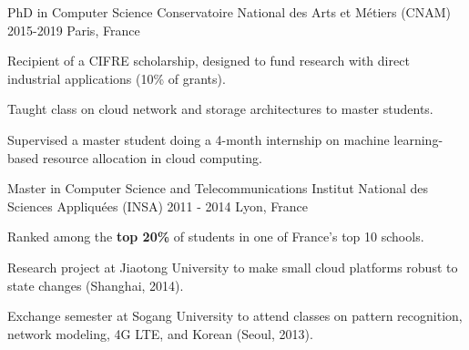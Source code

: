 
\begin{cventries}

  \cventry
  {PhD in Computer Science}
  {Conservatoire National des Arts et Métiers (CNAM)} %
  {2015-2019} %
  {Paris, France} %
    {
      \begin{cvitems} %
      \item{Recipient of a CIFRE scholarship, designed to fund research with direct industrial applications (10\% of grants).}
      \item {Taught class on cloud network and storage architectures to master students.}
      \item {Supervised a master student doing a 4-month internship on machine learning-based resource allocation in cloud computing.}
      \end{cvitems}
    }
  
  \cventry
    {Master in Computer Science and Telecommunications} %
    {Institut National des Sciences Appliquées (INSA)} %
    {2011 - 2014} %
    {Lyon, France} %
    {
      \begin{cvitems} %
      \item {Ranked among the \textbf{top 20\%} of students in one of France's top 10 schools.}
      \item {Research project at Jiaotong University to make small cloud platforms robust to state changes (Shanghai, 2014).}
      \item {Exchange semester at Sogang University to attend classes on pattern recognition, network modeling, 4G LTE, and Korean (Seoul, 2013).}
      \end{cvitems}
    }

\end{cventries}
